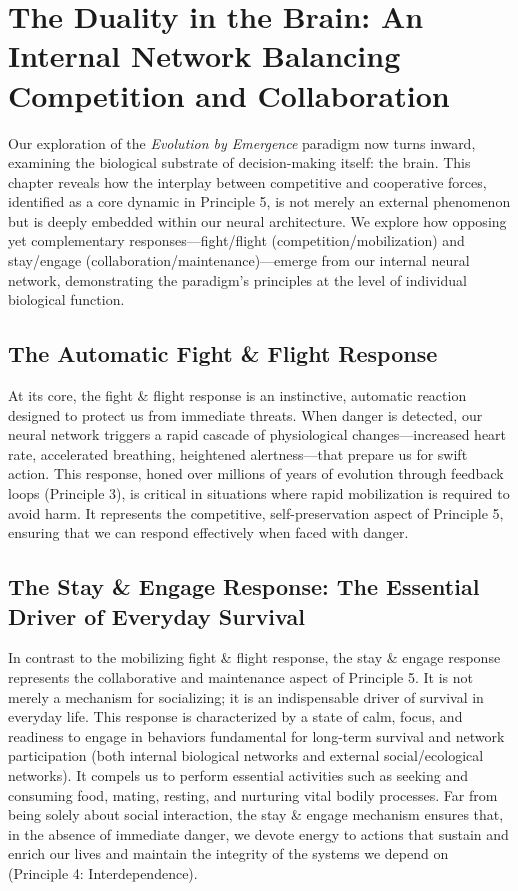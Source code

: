 \chapter{The Duality in the Brain: An Internal Network Balancing Competition and Collaboration} %
\label{ch:BrainDuality}

Our exploration of the \emph{Evolution by Emergence} paradigm now turns inward, examining the biological substrate of decision-making itself: the brain. This chapter reveals how the interplay between competitive and cooperative forces, identified as a core dynamic in Principle 5, is not merely an external phenomenon but is deeply embedded within our neural architecture. We explore how opposing yet complementary responses—fight/flight (competition/mobilization) and stay/engage (collaboration/maintenance)—emerge from our internal neural network, demonstrating the paradigm's principles at the level of individual biological function. %

\section{The Automatic Fight \& Flight Response}
At its core, the fight \& flight response is an instinctive, automatic reaction designed to protect us from immediate threats. When danger is detected, our neural network triggers a rapid cascade of physiological changes—increased heart rate, accelerated breathing, heightened alertness—that prepare us for swift action. This response, honed over millions of years of evolution through feedback loops (Principle 3), is critical in situations where rapid mobilization is required to avoid harm. It represents the competitive, self-preservation aspect of Principle 5, ensuring that we can respond effectively when faced with danger.

\section{The Stay \& Engage Response: The Essential Driver of Everyday Survival}
In contrast to the mobilizing fight \& flight response, the stay \& engage response represents the collaborative and maintenance aspect of Principle 5. It is not merely a mechanism for socializing; it is an indispensable driver of survival in everyday life. This response is characterized by a state of calm, focus, and readiness to engage in behaviors fundamental for long-term survival and network participation (both internal biological networks and external social/ecological networks). It compels us to perform essential activities such as seeking and consuming food, mating, resting, and nurturing vital bodily processes. Far from being solely about social interaction, the stay \& engage mechanism ensures that, in the absence of immediate danger, we devote energy to actions that sustain and enrich our lives and maintain the integrity of the systems we depend on (Principle 4: Interdependence). %

